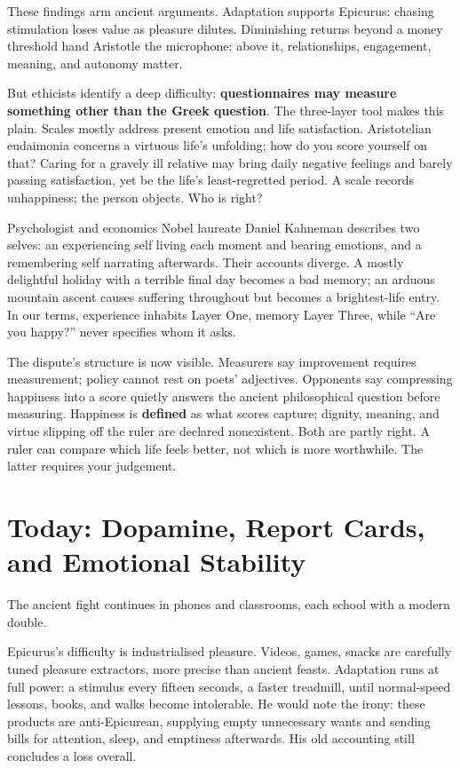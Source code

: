 These findings arm ancient arguments. Adaptation supports Epicurus: chasing stimulation loses value as pleasure dilutes. Diminishing returns beyond a money threshold hand Aristotle the microphone: above it, relationships, engagement, meaning, and autonomy matter.

But ethicists identify a deep difficulty: \textbf{questionnaires may measure something other than the Greek question}. The three-layer tool makes this plain. Scales mostly address present emotion and life satisfaction. Aristotelian eudaimonia concerns a virtuous life's unfolding; how do you score yourself on that? Caring for a gravely ill relative may bring daily negative feelings and barely passing satisfaction, yet be the life's least-regretted period. A scale records unhappiness; the person objects. Who is right?

Psychologist and economics Nobel laureate Daniel Kahneman describes two selves: an experiencing self living each moment and bearing emotions, and a remembering self narrating afterwards. Their accounts diverge. A mostly delightful holiday with a terrible final day becomes a bad memory; an arduous mountain ascent causes suffering throughout but becomes a brightest-life entry. In our terms, experience inhabits Layer One, memory Layer Three, while ``Are you happy?'' never specifies whom it asks.

The dispute's structure is now visible. Measurers say improvement requires measurement; policy cannot rest on poets' adjectives. Opponents say compressing happiness into a score quietly answers the ancient philosophical question before measuring. Happiness is \textbf{defined} as what scores capture; dignity, meaning, and virtue slipping off the ruler are declared nonexistent. Both are partly right. A ruler can compare which life feels better, not which is more worthwhile. The latter requires your judgement.

\section[Dopamine, Marks, and Emotional Stability]{Today: Dopamine, Report Cards, and Emotional Stability}
The ancient fight continues in phones and classrooms, each school with a modern double.

Epicurus's difficulty is industrialised pleasure. Videos, games, snacks are carefully tuned pleasure extractors, more precise than ancient feasts. Adaptation runs at full power: a stimulus every fifteen seconds, a faster treadmill, until normal-speed lessons, books, and walks become intolerable. He would note the irony: these products are anti-Epicurean, supplying empty unnecessary wants and sending bills for attention, sleep, and emptiness afterwards. His old accounting still concludes a loss overall.

